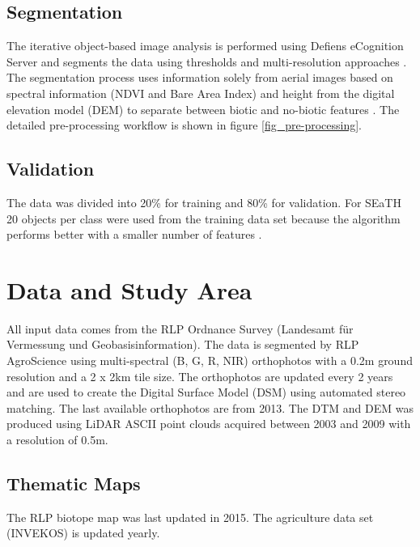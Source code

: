 \documentclass[authoryear, review,12pt,number]{elsarticle}
\begin{document}
\subsection{Segmentation} 
\label{subsec_segmentation}
The iterative object-based image analysis is performed using Defiens eCognition
Server and segments the data using thresholds and multi-resolution approaches 
\citep{baatz2001ecognition}.
The segmentation process uses information solely from
aerial images based on spectral information (NDVI and Bare Area Index) and
height from the digital elevation model (DEM) to separate between biotic and
no-biotic features \citep{Tintrup2015}. The detailed pre-processing workflow is
shown in figure \ref{fig_pre-processing}.
\subsection{Validation} 
The data was divided into 20\% for training and 80\% for validation. For SEaTH
20 objects per class were used from the training data set because the algorithm
performs better with a smaller number of features \citep{Nussbaum2006}. 
\section{Data and Study Area}
All input data comes from the RLP Ordnance Survey (Landesamt f\"ur Vermessung 
und Geobasisinformation). The data is segmented by RLP AgroScience using
multi-spectral (B, G, R, NIR) orthophotos with a 0.2m ground resolution and a
2 x 2km tile size. The orthophotos are updated every 2 years and are used to
create the Digital Surface Model (DSM) using automated stereo matching. The
last available orthophotos are from 2013. The DTM and
DEM was produced using LiDAR ASCII point clouds acquired between 2003 and 2009
with a resolution of 0.5m.\\
\subsection{Thematic Maps} The RLP biotope map was last updated in 2015. The
agriculture data set (INVEKOS) is updated yearly. 
\end{document}
